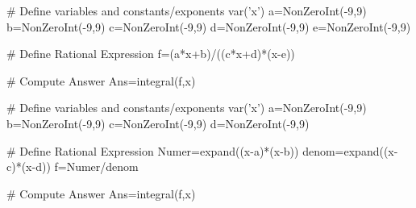 
\begin{sagesilent}
# Define variables and constants/exponents
var('x')
a=NonZeroInt(-9,9)
b=NonZeroInt(-9,9)
c=NonZeroInt(-9,9)
d=NonZeroInt(-9,9)
e=NonZeroInt(-9,9)


# Define Rational Expression
f=(a*x+b)/((c*x+d)*(x-e))

# Compute Answer
Ans=integral(f,x)
\end{sagesilent}



\begin{sagesilent}
# Define variables and constants/exponents
var('x')
a=NonZeroInt(-9,9)
b=NonZeroInt(-9,9)
c=NonZeroInt(-9,9)
d=NonZeroInt(-9,9)


# Define Rational Expression
Numer=expand((x-a)*(x-b))
denom=expand((x-c)*(x-d))
f=Numer/denom

# Compute Answer
Ans=integral(f,x)
\end{sagesilent}


